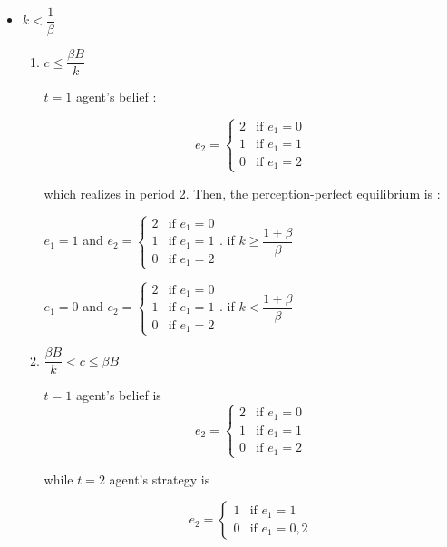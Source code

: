 \documentclass{jsarticle}
\begin{document}
\begin{enumerate}
\begin{enumerate}
\begin{itemize}
\begin{enumerate}
 \end{enumerate}

\item $k<\dfrac{1}{\beta}$

 \begin{enumerate}
 
 \item $c \leq \dfrac{\beta B}{k}$
 
 $t=1$ agent's belief :
 
 \[e_2 = \begin{cases}
 2 & \text{if } e_1=0 \\
 1 & \text{if } e_1=1 \\
 0 & \text{if } e_1=2
 \end{cases} \]
 
 which realizes in period 2. Then, the perception-perfect equilibrium is :
 
 \begin{center}
 
 $e_1=1$ and $e_2 = \begin{cases}
 2 & \text{if } e_1=0 \\
 1 & \text{if } e_1=1 \\
 0 & \text{if } e_1=2
 \end{cases} $. if $ k \geq \dfrac{1+\beta}{\beta}$
 
 $e_1=0$ and $e_2 = \begin{cases}
 2 & \text{if } e_1=0 \\
 1 & \text{if } e_1=1 \\
 0 & \text{if } e_1=2
 \end{cases} $. if $ k < \dfrac{1+\beta}{\beta}$
 
 \end{center}
 
 \item $\dfrac{\beta B}{k} < c \leq \beta B$
 
 $t=1$ agent's belief is
 \[e_2 = \begin{cases}
 2 & \text{if } e_1=0 \\
 1 & \text{if } e_1=1 \\
 0 & \text{if } e_1=2
 \end{cases} \]
 
 while $t=2$ agent's strategy is
 
 \[e_2 = \begin{cases}
 1 & \text{if } e_1=1 \\
 0 & \text{if } e_1=0,2
 \end{cases} \]
 

\end{enumerate}
\end{itemize}
\end{enumerate}
\end{enumerate}
\end{document}
